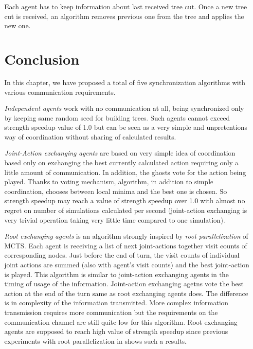 Each agent has to keep information about last received tree cut. Once a new tree cut is
received, an algorithm removes previous one from the tree and applies the new one.


\section{Conclusion}
\label{sec_dmcts_comparison}


In this chapter, we have proposed a total of five synchronization algorithms with various
communication requirements.

\emph{Independent agents} work with no communication at all, being
synchronized only by keeping same random seed for building trees. Such agents cannot exceed
strength speedup value of 1.0 but can be seen as a very simple and unpretentions way of
coordination without sharing of calculated results.

\emph{Joint-Action exchanging agents} are based on very simple idea of coordination based only
on exchanging the best currently calculated action requiring only a little amount of
communication. In addition, the ghosts vote for the action
being played. Thanks to voting mechanism, algorithm, in addition to simple coordination,
chooses between local minima and the best one is chosen. So strength speedup may reach a value
of strength speedup over 1.0 with almost no regret on number of simulations calculated per
second (joint-action exchanging is very trivial operation taking very little time compared to
one simulation).

\emph{Root exchanging agents} is an algorithm strongly inspired by \emph{root parallelization}
of MCTS. Each agent is receiving a list of next joint-actions together visit counts of
corresponding nodes. Just before the end of turn, the visit counts of individual joint actions
are summed (also with agent's visit counts) and the best joint-action is played. This algorithm
is similar to joint-action exchanging agents in the timing of usage of the information.
Joint-action exchanging agetns vote the best action at the end of the turn same as root
exchanging agents does. The difference is in complexity of the information transmitted. 
More complex information transmission requires more communication but the requirements on the
communication channel are still quite low for this algorithm.
Root
exchanging agents are supposed to reach high value of strength speedup since previous
experiments with root parallelization in \cite{Chaslot2008} shows such a results.

